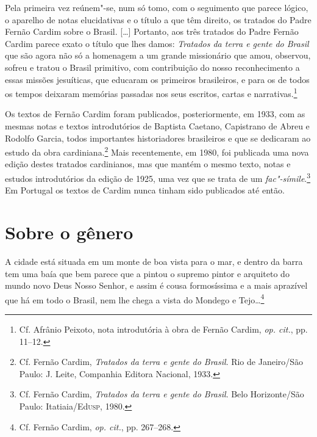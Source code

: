 \begin{hedraquote}
Pela primeira vez reúnem"-se, num só tomo, com o seguimento
que parece lógico, o aparelho de notas elucidativas e o título a que
têm direito, os tratados do Padre Fernão Cardim sobre o Brasil. [\ldots{}]
Portanto, aos três tratados do Padre Fernão Cardim parece exato o
título que lhes damos: \textit{Tratados da terra e gente do Brasil} 
que são agora não só a homenagem a um grande missionário que
amou, observou, sofreu e tratou o Brasil primitivo, com contribuição do
nosso reconhecimento a essas missões jesuíticas, que educaram os
primeiros brasileiros, e para os de todos os tempos deixaram memórias
passadas nos seus escritos, cartas e narrativas.\footnote{ Cf. Afrânio Peixoto, 
nota introdutória à obra de Fernão Cardim, \textit{op. cit.}, pp. 11--12.} 
\end{hedraquote}

 Os textos de Fernão Cardim foram publicados, posteriormente,
em 1933, com as mesmas notas e textos introdutórios de Baptista
Caetano, Capistrano de Abreu e Rodolfo Garcia, todos importantes
historiadores brasileiros e que se dedicaram ao estudo da obra
cardiniana.\footnote{ Cf. Fernão Cardim, \textit{Tratados da terra
e gente do Brasil}. Rio de Janeiro/São Paulo: J. Leite, Companhia
Editora Nacional, 1933.} Mais recentemente, em 1980, foi publicada uma nova
edição destes tratados cardinianos, mas que mantém o mesmo
texto, notas e estudos introdutórios da edição de 1925, uma vez que se
trata de um \textit{fac"-símile}.\footnote{ Cf. Fernão Cardim, \textit{Tratados
da terra e gente do Brasil}. Belo Horizonte/São Paulo: Itatiaia/Ed\textsc{usp}, 1980.} 
Em Portugal os textos de Cardim nunca tinham sido publicados até então.

\section{Sobre o gênero}

\begin{hedraquote}
A cidade está situada em um monte de boa vista para o mar,
e dentro da barra tem uma baía que bem parece que a pintou o supremo
pintor e arquiteto do mundo novo Deus Nosso Senhor, e assim é cousa
formosíssima e a mais aprazível que há em todo o Brasil, nem lhe chega
a vista do Mondego e Tejo\ldots{}\footnote{ Cf. Fernão Cardim,
\textit{op. cit.}, pp. 267--268.}
\end{hedraquote}
 

